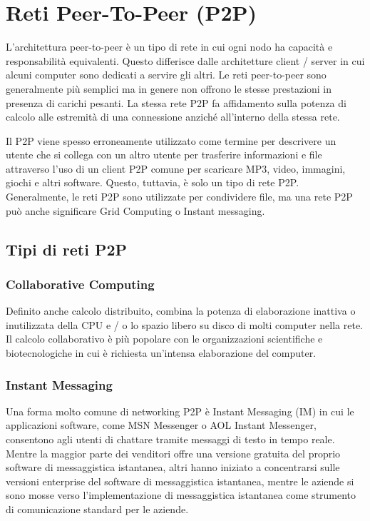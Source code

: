 \section{Reti Peer-To-Peer (P2P)}
L'architettura peer-to-peer è un tipo di rete in cui ogni nodo ha capacità e
responsabilità equivalenti. Questo differisce dalle architetture client /
server in cui alcuni computer sono dedicati a servire gli altri. Le reti
peer-to-peer sono generalmente più semplici ma in genere non offrono le stesse
prestazioni in presenza di carichi pesanti. La stessa rete P2P fa affidamento
sulla potenza di calcolo alle estremità di una connessione anziché all'interno
della stessa rete.

Il P2P viene spesso erroneamente utilizzato come termine per descrivere un
utente che si collega con un altro utente per trasferire informazioni e file
attraverso l'uso di un client P2P comune per scaricare MP3, video, immagini,
giochi e altri software. Questo, tuttavia, è solo un tipo di rete P2P.
Generalmente, le reti P2P sono utilizzate per condividere file, ma una rete P2P
può anche significare Grid Computing o Instant messaging.

\subsection{Tipi di reti P2P}
\subsubsection{Collaborative Computing}
Definito anche calcolo distribuito, combina la potenza di elaborazione inattiva
o inutilizzata della CPU e / o lo spazio libero su disco di molti computer
nella rete. Il calcolo collaborativo è più popolare con le organizzazioni
scientifiche e biotecnologiche in cui è richiesta un'intensa elaborazione del
computer.
\subsubsection{Instant Messaging}
Una forma molto comune di networking P2P è Instant Messaging (IM) in cui le
applicazioni software, come MSN Messenger o AOL Instant Messenger,
consentono agli utenti di chattare tramite messaggi di testo in tempo reale.
Mentre la maggior parte dei venditori offre una versione gratuita del proprio
software di messaggistica istantanea, altri hanno iniziato a concentrarsi sulle
versioni enterprise del software di messaggistica istantanea, mentre le aziende
si sono mosse verso l'implementazione di messaggistica istantanea come
strumento di comunicazione standard per le aziende.

